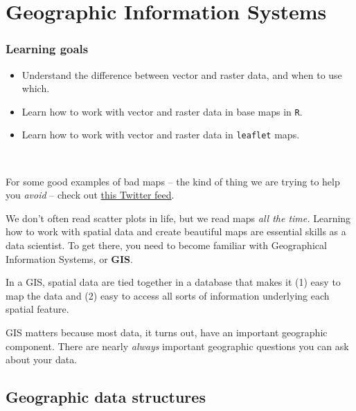 \documentclass[]{book}
\providecommand{\tightlist}{%
  \setlength{\itemsep}{0pt}\setlength{\parskip}{0pt}}
\begin{document}
\hypertarget{geographic-information-systems}{%
\chapter{Geographic Information Systems}\label{geographic-information-systems}}

\hypertarget{learning-goals-36}{%
\subsection*{Learning goals}\label{learning-goals-36}}

\begin{itemize}
\tightlist
\item
  Understand the difference between vector and raster data, and when to use which.\\
\item
  Learn how to work with vector and raster data in base maps in \texttt{R}.\\
\item
  Learn how to work with vector and raster data in \texttt{leaflet} maps.
\end{itemize}

~

For some good examples of bad maps -- the kind of thing we are trying to help you \emph{avoid} -- check out \href{https://twitter.com/terriblemaps?lang=en}{this Twitter feed}.

We don't often read scatter plots in life, but we read maps \emph{all the time.} Learning how to work with spatial data and create beautiful maps are essential skills as a data scientist. To get there, you need to become familiar with Geographical Information Systems, or \textbf{GIS}.

In a GIS, spatial data are tied together in a database that makes it (1) easy to map the data and (2) easy to access all sorts of information underlying each spatial feature.

GIS matters because most data, it turns out, have an important geographic component. There are nearly \emph{always} important geographic questions you can ask about your data.

\hypertarget{geographic-data-structures}{%
\section*{Geographic data structures}\label{geographic-data-structures}}
\end{document}
